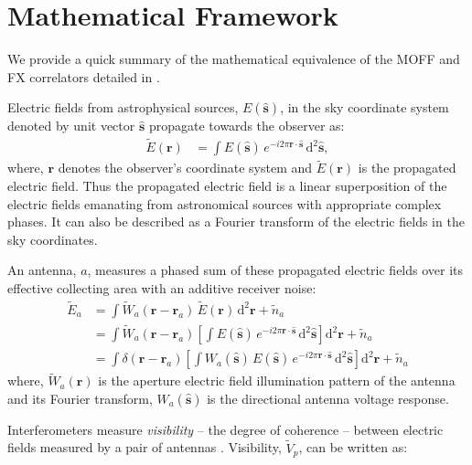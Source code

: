 \documentclass[a4paper,fleqn,usenatbib]{../mnras}
\newcommand{\dif}{\mathrm{d}}
\begin{document}

\section{Mathematical Framework}\label{sec:math}

We provide a quick summary of the mathematical equivalence of the MOFF and FX
correlators detailed in \citet{mor11}.

Electric fields from astrophysical sources, $E(\hat{\mathbf{s}})$, in the sky
coordinate system denoted by unit vector $\hat{\mathbf{s}}$ propagate towards
the observer as:
\begin{align}
  \widetilde{E}(\mathbf{r}) &= \int E(\hat{\mathbf{s}})\,e^{-i2\pi\mathbf{r}\cdot\hat{\mathbf{s}}}\,\dif^2\hat{\mathbf{s}},
\end{align}
where, $\mathbf{r}$ denotes the observer's coordinate system and $\widetilde{E}
(\mathbf{r})$ is the propagated electric field. Thus the propagated electric
field is a linear superposition of the electric fields emanating from
astronomical sources with appropriate complex phases. It can also be described
as a Fourier transform of the electric fields in the sky coordinates. 

An antenna, $a$, measures a phased sum of these propagated electric fields over
its effective collecting area with an additive receiver noise:
\begin{align}\label{eqn:measured-E-field}
  \widetilde{E}_a &= \int \widetilde{W}_a(\mathbf{r}-\mathbf{r}_a)\,\widetilde{E}(\mathbf{r})\,\dif^2\mathbf{r} + \widetilde{n}_a \\
                  &= \int \widetilde{W}_a(\mathbf{r}-\mathbf{r}_a) \left[ \int E(\hat{\mathbf{s}})\,e^{-i2\pi\mathbf{r}\cdot\hat{\mathbf{s}}}\,\dif^2\hat{\mathbf{s}} \right] \dif^2\mathbf{r} + \widetilde{n}_a \\
                  &= \int \delta(\mathbf{r}-\mathbf{r}_a) \left[ \int {W}_a(\hat{\mathbf{s}})\,E(\hat{\mathbf{s}})\,e^{-i2\pi\mathbf{r}\cdot\hat{\mathbf{s}}}\,\dif^2\hat{\mathbf{s}} \right] \dif^2\mathbf{r} + \widetilde{n}_a
\end{align}
where, $\widetilde{W}_a(\mathbf{r})$ is the aperture electric field illumination
pattern of the antenna and its Fourier transform, $W_a(\hat{\mathbf{s}})$ is the
directional antenna voltage response.

Interferometers measure {\it visibility} -- the degree of coherence -- between
electric fields measured by a pair of antennas \citep{van34,zer38,tho01}.
Visibility, $\widetilde{V}_p$, can be written as:
\end{document}
